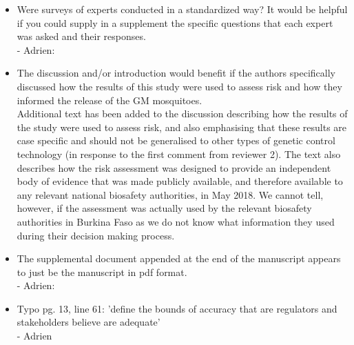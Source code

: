 \documentclass[12pt]{paper}
\begin{document}
{\begin{itemize}
{ \color{red} In the Methods, we have elaborated on the expert background and also added clarification that the experts were encouraged to draw not only on their own research but also the published literature when contributing their assessments: 
``For this analysis we carefully elicited opinions on the mortality rate and dispersal distance of WT and DSM male mosquitoes from four independent recognised experts on malaria transmission by mosquitoes in Africa and genetic vector control methods; the independent experts were not involved in the development of the DSM mosquitoes \cite{Hayes2015a}. The experts were encouraged to draw on their own research experience and knowledge of the published literature while constructing their assessments.''}
\item   Were surveys of experts conducted in a standardized way? It would be helpful if you could supply in a supplement the specific questions that each expert was asked and their responses.\\
{\color{red} - Adrien:}
\item  The discussion and/or introduction would benefit if the authors specifically discussed how the results of this study were used to assess risk and how they informed the release of the GM mosquitoes.\\
{\color{red} Additional text has been added to the discussion describing how the results of the study were used to assess risk, and also emphasising that these results are case specific and should not be generalised to other types of genetic control technology (in response to the first comment from reviewer 2). The text also describes how the risk assessment was designed to provide an independent body of evidence that was made publicly available, and therefore available to any relevant national biosafety authorities, in May 2018. We cannot tell, however, if the assessment was actually used by the relevant biosafety authorities in Burkina Faso as we do not know what information they used during their decision making process.}
\item  The supplemental document appended at the end of the manuscript appears to just be the manuscript in pdf format.\\
{\color{red} - Adrien:}
\item  Typo pg. 13, line 61: 'define the bounds of accuracy that are regulators and stakeholders believe are adequate'\\
{\color{red} - Adrien}
\end{itemize}
}
~\\
~\\
\end{document}
